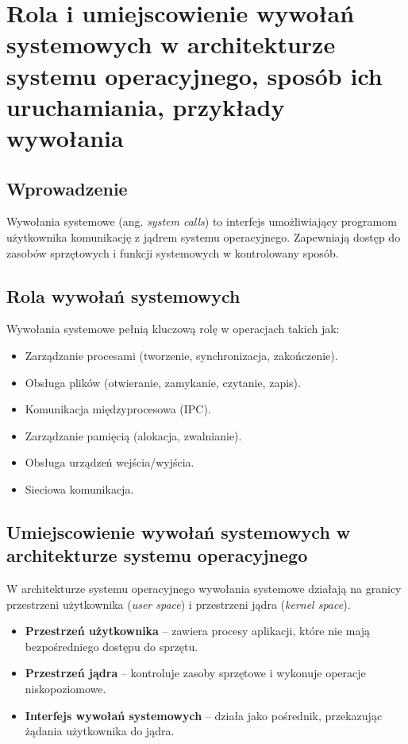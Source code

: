 \section{Rola i umiejscowienie wywołań systemowych w architekturze systemu operacyjnego, sposób ich uruchamiania, przykłady wywołania}

\subsection{Wprowadzenie}
Wywołania systemowe (ang. \textit{system calls}) to interfejs umożliwiający programom użytkownika komunikację z jądrem systemu operacyjnego. Zapewniają dostęp do zasobów sprzętowych i funkcji systemowych w kontrolowany sposób.

\subsection{Rola wywołań systemowych}
Wywołania systemowe pełnią kluczową rolę w operacjach takich jak:
\begin{itemize}
    \item Zarządzanie procesami (tworzenie, synchronizacja, zakończenie).
    \item Obsługa plików (otwieranie, zamykanie, czytanie, zapis).
    \item Komunikacja międzyprocesowa (IPC).
    \item Zarządzanie pamięcią (alokacja, zwalnianie).
    \item Obsługa urządzeń wejścia/wyjścia.
    \item Sieciowa komunikacja.
\end{itemize}

\subsection{Umiejscowienie wywołań systemowych w architekturze systemu operacyjnego}
W architekturze systemu operacyjnego wywołania systemowe działają na granicy przestrzeni użytkownika (\textit{user space}) i przestrzeni jądra (\textit{kernel space}).

\begin{itemize}
    \item \textbf{Przestrzeń użytkownika} – zawiera procesy aplikacji, które nie mają bezpośredniego dostępu do sprzętu.
    \item \textbf{Przestrzeń jądra} – kontroluje zasoby sprzętowe i wykonuje operacje niskopoziomowe.
    \item \textbf{Interfejs wywołań systemowych} – działa jako pośrednik, przekazując żądania użytkownika do jądra.
\end{itemize}

